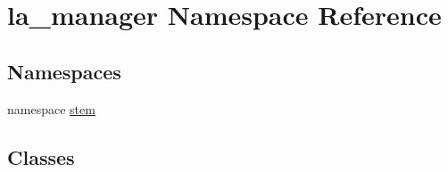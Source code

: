 \hypertarget{namespacela__manager}{
\section{la\_\-manager Namespace Reference}
\label{namespacela__manager}
}
\subsection*{Namespaces}
\begin{CompactItemize}
\item 
namespace \hyperlink{namespacela__manager_1_1stem}{stem}
\end{CompactItemize}
\subsection*{Classes}
